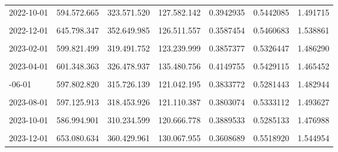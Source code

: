 \documentclass[12pt]{article}
\begin{document}
\begin{longtable}[t]{llllrrr}
2022-10-01 & 594.572.665 & 323.571.520 & 127.582.142 & 0.3942935 & 0.5442085 & 1.491715\\
\cellcolor{gray!10}{2022-11-01} & \cellcolor{gray!10}{606.868.801} & \cellcolor{gray!10}{331.747.472} & \cellcolor{gray!10}{116.411.309} & \cellcolor{gray!10}{0.3509034} & \cellcolor{gray!10}{0.5466544} & \cellcolor{gray!10}{1.549983}\\
2022-12-01 & 645.798.347 & 352.649.985 & 126.511.557 & 0.3587454 & 0.5460683 & 1.538861\\
\addlinespace
\cellcolor{gray!10}{2023-01-01} & \cellcolor{gray!10}{595.517.983} & \cellcolor{gray!10}{312.461.652} & \cellcolor{gray!10}{130.433.449} & \cellcolor{gray!10}{0.4174383} & \cellcolor{gray!10}{0.5246889} & \cellcolor{gray!10}{1.440224}\\
2023-02-01 & 599.821.499 & 319.491.752 & 123.239.999 & 0.3857377 & 0.5326447 & 1.486290\\
\cellcolor{gray!10}{2023-03-01} & \cellcolor{gray!10}{600.411.789} & \cellcolor{gray!10}{323.548.712} & \cellcolor{gray!10}{136.451.310} & \cellcolor{gray!10}{0.4217334} & \cellcolor{gray!10}{0.5388780} & \cellcolor{gray!10}{1.452676}\\
2023-04-01 & 601.348.363 & 326.478.937 & 135.480.756 & 0.4149755 & 0.5429115 & 1.465452\\
\cellcolor{gray!10}{2023-05-01} & \cellcolor{gray!10}{588.530.231} & \cellcolor{gray!10}{314.584.231} & \cellcolor{gray!10}{122.402.679} & \cellcolor{gray!10}{0.3890935} & \cellcolor{gray!10}{0.5345252} & \cellcolor{gray!10}{1.484880}\\
\addlinespace
2023-06-01 & 597.802.820 & 315.726.139 & 121.042.195 & 0.3833772 & 0.5281443 & 1.482944\\
\cellcolor{gray!10}{2023-07-01} & \cellcolor{gray!10}{595.150.194} & \cellcolor{gray!10}{311.281.724} & \cellcolor{gray!10}{111.005.758} & \cellcolor{gray!10}{0.3566087} & \cellcolor{gray!10}{0.5230305} & \cellcolor{gray!10}{1.507189}\\
2023-08-01 & 597.125.913 & 318.453.926 & 121.110.387 & 0.3803074 & 0.5333112 & 1.493627\\
\cellcolor{gray!10}{2023-09-01} & \cellcolor{gray!10}{593.557.239} & \cellcolor{gray!10}{315.874.042} & \cellcolor{gray!10}{126.783.652} & \cellcolor{gray!10}{0.4013741} & \cellcolor{gray!10}{0.5321712} & \cellcolor{gray!10}{1.467505}\\
2023-10-01 & 586.994.901 & 310.234.599 & 120.666.778 & 0.3889533 & 0.5285133 & 1.476988\\
\addlinespace
\cellcolor{gray!10}{2023-11-01} & \cellcolor{gray!10}{619.605.400} & \cellcolor{gray!10}{340.053.855} & \cellcolor{gray!10}{125.998.595} & \cellcolor{gray!10}{0.3705254} & \cellcolor{gray!10}{0.5488233} & \cellcolor{gray!10}{1.527815}\\
2023-12-01 & 653.080.634 & 360.429.961 & 130.067.955 & 0.3608689 & 0.5518920 & 1.544954\\
\bottomrule
\end{longtable}
\endgroup{}
\end{document}
